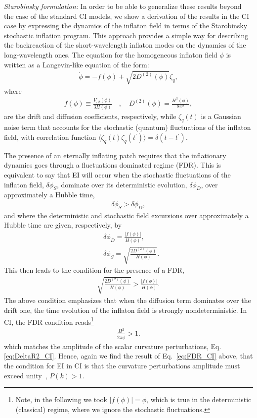 \documentclass[a4paper,11pt]{article}
\begin{document}
{\it Starobinsky formulation:} In order to be able to generalize these results  beyond the case of the standard CI models, 
we show a derivation of the results in the CI case
by expressing the dynamics of the inflaton field
in terms of the Starobinsky stochastic inflation
program.  This approach provides a simple way for
describing the backreaction of the  short-wavelength inflaton modes on
the dynamics of the long-wavelength ones. The equation for the
homogeneous inflaton field $\phi$ is written as a Langevin-like
equation of the form:
%
\begin{eqnarray}
  \dot{\phi}=-f(\phi)+\sqrt{2D^{(2)}(\phi)}\zeta_q,
  \label{eq:EOM_cold}
\end{eqnarray}
%
where
%
\begin{eqnarray}
    f(\phi)\equiv \frac{V_{,\phi}(\phi)}{3H(\phi)} \quad , \quad
    D^{(2)}(\phi)=\frac{H^3(\phi)}{8\pi^2},
\end{eqnarray}
%
are the drift and diffusion coefficients, respectively, while
$\zeta_q(t)$ is a Gaussian noise term that accounts for the stochastic
(quantum) fluctuations of the inflaton field, with correlation
function
$\langle\zeta_q(t)\zeta_q(t^\prime)\rangle=\delta(t-t^\prime)$.

The presence of an eternally inflating patch requires that the inflationary dynamics goes through a fluctuations dominated regime (FDR). This is equivalent to say that EI will occur when the stochastic fluctuations of the inflaton
field, $\delta\phi_S$, dominate over its deterministic evolution,
$\delta\phi_D$, over approximately a Hubble time,
%
\begin{eqnarray}
\delta\phi_S>\delta\phi_D, 
\label{eq:FDR1}
\end{eqnarray}
%
and where the deterministic and stochastic field excursions over
approximately a Hubble time are given, respectively, by
%
\begin{align}    &\delta\phi_D=\frac{|f(\phi)|}{H(\phi)},
  \label{eq:deltaphiD_C}\\
  &\delta\phi_S=\sqrt{\frac{2D^{(2)}(\phi)}{H(\phi)}}.
  \label{eq:deltaphiS_C}
\end{align}
%
This then leads to the condition for the presence of a FDR,
%
\begin{eqnarray}
 \sqrt{\frac{2D^{(2)}(\phi)}{H(\phi)}}>
 \frac{|f(\phi)|}{H(\phi)}. \label{eq:FDR}
\end{eqnarray}
%
The above condition emphasizes that when the diffusion term dominates
over the drift one, the time evolution of the inflaton field is
strongly nondeterministic.  In CI, the FDR condition
reads\footnote{Note, in the following we took $|f(\phi)|=\dot{\phi}$,
which is true in the deterministic (classical) regime, where we ignore
the stochastic fluctuations.}
%
\begin{eqnarray}
\frac{H^2}{2\pi\dot{\phi}}>1.
\end{eqnarray}
%
which matches the amplitude of the scalar curvature perturbations, Eq.\eqref{eq:DeltaR2_CI}. Hence, again we find the result of Eq.~\eqref{eq:FDR_CI} above, that the condition for EI in CI is that the curvature
perturbations amplitude must exceed
unity~\cite{Goncharov:1987ir,Guth:2007ng,Kinney:2014jya},
$P (k) > 1$. 
\end{document}
